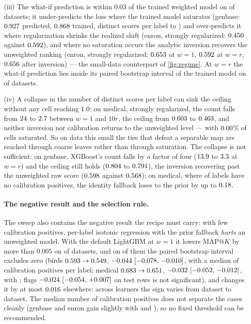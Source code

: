 \documentclass[sigconf,nonacm]{acmart}
\makeatletter
\newcommand{\mapk}{\mathrm{MAP}@K\xspace}
\makeatother
\begin{document}
(iii) The what-if prediction is within $0.03$ of the trained weighted model on \nnWhatifClose{} of \nnMulan{} datasets; it under-predicts the loss where the trained model saturates (genbase: $0.927$ predicted, $0.868$ trained, distinct scores per label \ngenbaseDistinctWone{} to \ngenbaseDistinctWr) and over-predicts it where regularization shrinks the realized shift (enron, strongly regularized: $0.450$ against $0.592$), and where no saturation occurs the analytic inversion recovers the unweighted ranking (enron, strongly regularized: $0.653$ at $w{=}1$, $0.592$ at $w{=}r$, $0.656$ after inversion) --- the small-data counterpart of \cref{fig:regime}. At $w{=}r$ the what-if prediction lies inside its paired bootstrap interval of the trained model on \nnWhatifCiCoversZero{} of \nnMulan{} datasets.

(iv) A collapse in the number of distinct scores per label can sink the ceiling without any cell reaching $1.0$: on medical, strongly regularized, the count falls from $24$ to $2.7$ between $w{=}1$ and $10r$, the ceiling from $0.603$ to $0.463$, and neither inversion nor calibration returns to the unweighted level --- with $0.00$\% of cells saturated. So on data this small the ties that defeat a separable map are reached through coarse leaves rather than through saturation. The collapse is not sufficient: on genbase, XGBoost's count falls by a factor of four ($13.9$ to $3.3$ at $w{=}r$) and the ceiling still holds ($0.804$ to $0.791$), the inversion recovering past the unweighted raw score ($0.598$ against $0.568$); on medical, where \nmedDeadCal{} of \nmedL{} labels have no calibration positives, the identity fallback loses to the prior by up to $0.18$.

\paragraph{The negative result and the selection rule.} The sweep also contains the negative result the recipe must carry: with few calibration positives, per-label isotonic regression with the prior fallback \emph{hurts} an unweighted model. With the default LightGBM at $w{=}1$ it lowers $\mapk$ by more than $0.005$ on \nnHurtDefault{} of \nnMulan{} datasets, and on \nnHurtTauZeroCI{} of them the paired bootstrap interval excludes zero (birds $0.593\to0.549$, $-0.044~[-0.078,\,-0.010]$, with a median of \ncalPosMedBirds{} calibration positives per label; medical $0.683\to0.651$, $-0.032~[-0.052,\,-0.012]$, with \ncalPosMedMedical; flags $-0.024~[-0.054,\,+0.007]$ on \nflagsNtest{} test rows is not significant), and changes it by at most $0.016$ elsewhere; across learners the sign varies from dataset to dataset. The median number of calibration positives does not separate the cases cleanly (genbase and enron gain slightly with \ncalPosMedGenbase{} and \ncalPosMedEnron), so no fixed threshold can be recommended.
\end{document}

